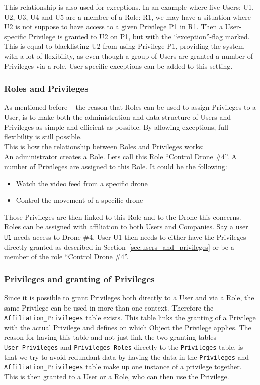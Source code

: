 This relationship is also used for exceptions.
In an example where five Users: U1, U2, U3, U4 and U5 are a member of a Role: R1, we may have a situation where U2 is not suppose to have access to a given Privilege P1 in R1.
Then a User-specific Privilege is granted to U2 on P1, but with the ``exception''-flag marked.
This is equal to blacklisting U2 from using Privilege P1, providing the system with a lot of flexibility, as even though a group of Users are granted a number of Privileges via a role, User-specific exceptions can be added to this setting. \\


\subsubsection{Roles and Privileges}
As mentioned before -- the reason that Roles can be used to assign Privileges to a User, is to make both the administration and data structure of Users and Privileges as simple and efficient as possible.
By allowing exceptions, full flexibility is still possible. \\

This is how the relationship between Roles and Privileges works: \\

An administrator creates a Role.
Lets call this Role ``Control Drone \#4''.
A number of Privileges are assigned to this Role.
It could be the following:

\begin{itemize}
    \item Watch the video feed from a specific drone
    \item Control the movement of a specific drone
\end{itemize}

Those Privileges are then linked to this Role and to the Drone this concerns. \\

Roles can be assigned with affiliation to both Users and Companies.
Say a user \verb+U1+ needs access to Drone \#4.
User U1 then needs to either have the Privileges directly granted as described in Section~\ref{sec:users_and_privileges} or be a member of the role ``Control Drone \#4''.


\subsubsection{Privileges and granting of Privileges}
Since it is possible to grant Privileges both directly to a User and via a Role, the same Privilege can be used in more than one context.
Therefore the \verb+Affiliation_Privileges+ table exists.
This table links the granting of a Privilege with the actual Privilege and defines on which Object the Privilege applies.
The reason for having this table and not just link the two granting-tables \verb+User_Privileges+ and \verb+Privileges_Roles+ directly to the \verb+Privileges+ table, is that we try to avoid redundant data by having the data in the \verb+Privileges+ and \verb+Affiliation_Privileges+ table make up one instance of a privilege together.
This is then granted to a User or a Role, who can then use the Privilege. \\

